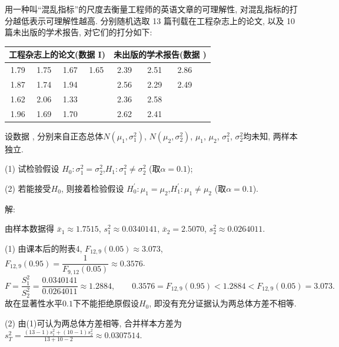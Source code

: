 \documentclass[standard]{ExBook}
\renewenvironment{shaded}{%
  \def\FrameCommand{\fboxsep=\FrameSep \colorbox{shadecolor}}%
  \MakeFramed{\advance\hsize-\width \FrameRestore}%
}{%
  \endMakeFramed
}
\begin{document}
\begin{qitems}
    \begin{bbox}
    \begin{shaded}
        \qitem
用一种叫``混乱指标''的尺度去衡量工程师的英语文章的可理解性, 对混乱指标的打分越低表示可理解性越高. 分别随机选取 13 篇刊载在工程杂志上的论文, 以及 10 篇未出版的学术报告, 对它们的打分如下:
\begin{center}
\setlength{\tabcolsep}{20pt}
\begin{tabular}{cccc|cccc}
\hline
\multicolumn{4}{c|}{工程杂志上的论文(数据 I)} & \multicolumn{4}{c}{未出版的学术报告(数据 \uppercase\expandafter{\romannumeral2})} \\
\hline
1.79 & 1.75 & 1.67 & 1.65 & 2.39 & 2.51 & 2.86 &  \\
1.87 & 1.74 & 1.94 &  & 2.56 & 2.29 & 2.49\\
1.62 & 2.06 & 1.33 &  & 2.36 & 2.58 &  &  \\
1.96 & 1.69 & 1.70 &  & 2.62 & 2.41 &  &  \\
\hline
\end{tabular}
\end{center}
设数据 \uppercase\expandafter{}, \uppercase\expandafter{} 分别来自正态总体$N(\mu_1,\sigma_1^2)$, $N(\mu_2,\sigma_2^2)$, $\mu_1$, $\mu_2$, $\sigma_1^2$, $\sigma_2^2$均未知, 两样本独立.

(1) 试检验假设 $H_0 : \sigma_1^2=\sigma_2^2$,\quad $H_1 : \sigma_1^2 \neq \sigma_2^2$ (取$\alpha=0.1$);

(2) 若能接受$H_0$, 则接着检验假设 $H_0^{'} : \mu_1=\mu_2$,\quad $H_1^{'} : \mu_1 \neq \mu_2$ (取$\alpha=0.1$).
    \end{shaded}
    \end{bbox}

\vspace{\dimexpr2.5cm-5em\relax}

解:

由样本数据得
$
\bar{x}_1\approx1.7515
$,
$
s_1^2\approx0.0340141
$,
$
\bar{x}_2=2.5070
$,
$
s_2^2\approx0.0264011
$.

(1) 由课本后的附表4,
$
F_{12,9}(0.05)\approx3.073
$,
$
F_{12,9}(0.95)
=\dfrac{1}{F_{9,12}(0.05)}
\approx0.3576
$.
$$
F
=
\frac{S_1^2}{S_2^2}
=
\frac{0.0340141}{0.0264011}
\approx1.2884,
\qquad
0.3576
=
F_{12,9}(0.95)
<
1.2884
<
F_{12,9}(0.05)
=
3.073.
$$
故在显著性水平$0.1$下不能拒绝原假设$H_0$, 即没有充分证据认为两总体方差不相等.

(2) 由(1)可认为两总体方差相等, 合并样本方差为
$
s_T^2
=
\frac{(13-1)s_1^2+(10-1)s_2^2}{13+10-2}
\approx0.0307514
$.


\end{qitems}
\end{document}
